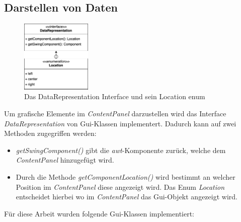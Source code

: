 \subsection{Darstellen von Daten}
\begin{figure}
  \vspace{-15pt}
  \includegraphics[width=0.3\textwidth,]{fig/GUI_DataRepresentation.png}
  \vspace{-15pt}
  \caption{Das DataRepresentation Interface und sein Location enum}
  \label{fig:DataRepresentation}
  \vspace{-30pt}
\end{figure}
Um grafische Elemente im \textit{ContentPanel} darzustellen wird das Interface \textit{DataRepresentation}
von Gui-Klassen implementert. Dadurch kann auf zwei Methoden zugegriffen werden:
\begin{itemize}
  \item \textit{getSwingComponent()} gibt die \textit{awt}-Komponente zurück, welche dem \textit{ContentPanel}
    hinzugefügt wird.
\item Durch die Methode \textit{getComponentLocation()} wird bestimmt an welcher
  Position im \textit{ContentPanel} diese angezeigt wird.
  Das Enum \textit{Location} entscheidet hierbei wo im \textit{ContentPanel} das Gui-Objekt
  angezeigt wird.

\end{itemize}





Für diese Arbeit wurden folgende Gui-Klassen implementiert:


\newpage
